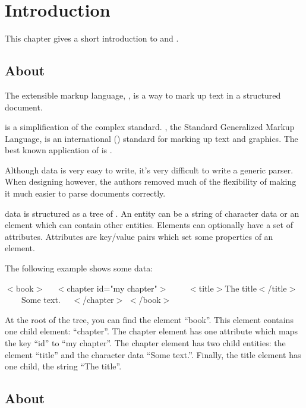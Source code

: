\chapter{Introduction}

This chapter gives a short introduction to \XML{} and \NanoXML{}.

\section{About \XML{}}

The extensible markup language,
\href{http://www.w3c.org/TR/REC-xml}{\XML{}}, is a way to mark up text in
a structured document.

\XML  is a simplification of the complex  standard.
, the Standard Generalized Markup Language, is an international
() standard for marking up text and graphics.
The best known application of  is .

Although  data is very easy to write, it's very difficult to write a
generic  parser.
When designing \XML{} however, the authors removed much of the flexibility
of  making it much easier to parse \XML{} documents correctly.

\XML{} data is structured as a tree of .
An entity can be a string of character data or an element which can contain other
entities.
Elements can optionally have a set of attributes.
Attributes are key/value pairs which set some properties of an element.

The following example shows some \XML{} data:

\begin{example}
$<$book$>$
~~$<$chapter id="my chapter"$>$
~~~~$<$title$>$The title$<$/title$>$
~~~~Some text.
~~$<$/chapter$>$
$<$/book$>$
\end{example}

At the root of the tree, you can find the element ``book''.
This element contains one child element: ``chapter''.
The chapter element has one attribute which maps the key ``id'' to
``my chapter''.
The chapter element has two child entities: the element ``title'' and the
character data ``Some text.''.
Finally, the title element has one child, the string ``The title''.

\section{About \NanoXML{}}

